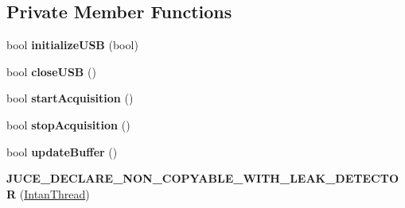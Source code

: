 \subsection*{Private Member Functions}
\begin{DoxyCompactItemize}
\item 
\hypertarget{classIntanThread_ad3ec9cdaf468082f5e5b58c8402c82f2}{bool {\bfseries initialize\-U\-S\-B} (bool)}\label{classIntanThread_ad3ec9cdaf468082f5e5b58c8402c82f2}

\item 
\hypertarget{classIntanThread_a2a9bb54b8e87969d8b946a6a20936392}{bool {\bfseries close\-U\-S\-B} ()}\label{classIntanThread_a2a9bb54b8e87969d8b946a6a20936392}

\item 
\hypertarget{classIntanThread_adbbfb2e7c3731875a9a2bcc8efdae038}{bool {\bfseries start\-Acquisition} ()}\label{classIntanThread_adbbfb2e7c3731875a9a2bcc8efdae038}

\item 
\hypertarget{classIntanThread_a2950c58ba91e3a4f717516cfa48733da}{bool {\bfseries stop\-Acquisition} ()}\label{classIntanThread_a2950c58ba91e3a4f717516cfa48733da}

\item 
\hypertarget{classIntanThread_a40a6417cb852d65de460f18370391c86}{bool {\bfseries update\-Buffer} ()}\label{classIntanThread_a40a6417cb852d65de460f18370391c86}

\item 
\hypertarget{classIntanThread_ad2c507a9a429e1e23bf43268a6c57545}{{\bfseries J\-U\-C\-E\-\_\-\-D\-E\-C\-L\-A\-R\-E\-\_\-\-N\-O\-N\-\_\-\-C\-O\-P\-Y\-A\-B\-L\-E\-\_\-\-W\-I\-T\-H\-\_\-\-L\-E\-A\-K\-\_\-\-D\-E\-T\-E\-C\-T\-O\-R} (\hyperlink{classIntanThread}{Intan\-Thread})}\label{classIntanThread_ad2c507a9a429e1e23bf43268a6c57545}

\end{DoxyCompactItemize}
